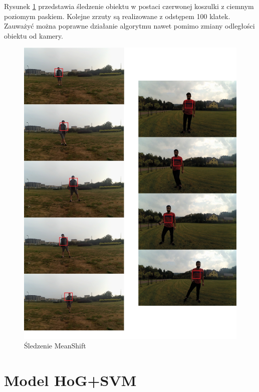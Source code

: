 Rysunek \ref{fig:meanshift_prog} przedstawia śledzenie obiektu w postaci czerwonej koszulki z ciemnym poziomym paskiem. Kolejne zrzuty są realizowane z odstępem 100 klatek. Zauważyć można poprawne działanie algorytmu nawet pomimo zmiany odległości obiektu od kamery.
 
\begin{figure}[]
	\centering
	\includegraphics[width=16cm]{3_meanshift.jpg}
	\caption{Śledzenie MeanShift}
	\label{fig:meanshift_prog}
\end{figure}


\section{Model HoG+SVM}


